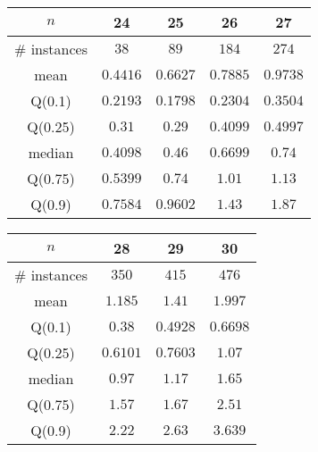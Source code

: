 \begin{tabular}{c|cccc} 
\hline 
$n$ & 24 & 25 & 26 & 27 \tabularnewline 
\hline 
\hline 
\# instances & $38$ & $89$ & $184$ & $274$ \tabularnewline 
mean & $0.4416$ & $0.6627$ & $0.7885$ & $0.9738$ \tabularnewline 
Q(0.1) & $0.2193$ & $0.1798$ & $0.2304$ & $0.3504$ \tabularnewline 
Q(0.25) & $0.31$ & $0.29$ & $0.4099$ & $0.4997$ \tabularnewline 
median & $0.4098$ & $0.46$ & $0.6699$ & $0.74$ \tabularnewline 
Q(0.75) & $0.5399$ & $0.74$ & $1.01$ & $1.13$ \tabularnewline 
Q(0.9) & $0.7584$ & $0.9602$ & $1.43$ & $1.87$ \tabularnewline 
\hline 
\end{tabular} 
\medskip{} 

\begin{tabular}{c|ccc} 
\hline 
$n$ & 28 & 29 & 30 \tabularnewline 
\hline 
\hline 
\# instances & $350$ & $415$ & $476$ \tabularnewline 
mean & $1.185$ & $1.41$ & $1.997$ \tabularnewline 
Q(0.1) & $0.38$ & $0.4928$ & $0.6698$ \tabularnewline 
Q(0.25) & $0.6101$ & $0.7603$ & $1.07$ \tabularnewline 
median & $0.97$ & $1.17$ & $1.65$ \tabularnewline 
Q(0.75) & $1.57$ & $1.67$ & $2.51$ \tabularnewline 
Q(0.9) & $2.22$ & $2.63$ & $3.639$ \tabularnewline 
\hline 
\end{tabular} 
\medskip{} 

